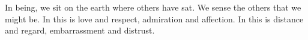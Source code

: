 

﻿In being, we sit on the earth where others have sat.  We sense the
others that we might be.  In this is love and respect, admiration and
affection.  In this is distance and regard, embarrassment and
distrust.

\bye
